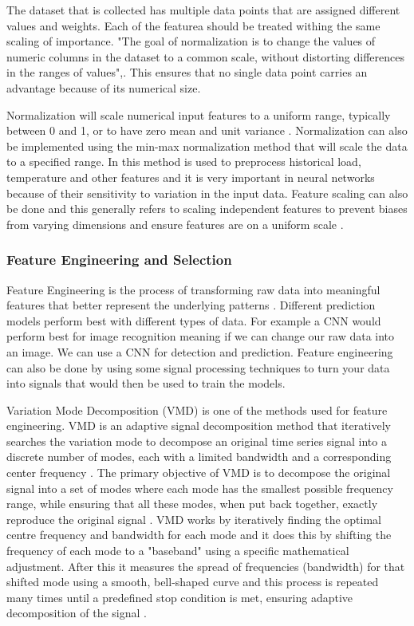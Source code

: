 The dataset that is collected has multiple data points that are assigned different values and weights. Each of the featurea should be treated withing the same scaling of importance. "The goal of normalization is to change the values of numeric columns in the dataset to a common scale, without distorting differences in the ranges of values",\cite{kappal2019data}. This ensures that no single data point carries an advantage because of its numerical size.

Normalization will scale numerical input features to a uniform range, typically between 0 and 1, or to have zero mean and unit variance \cite{dong2021short}. Normalization can also be implemented using the min-max normalization method that will scale the data to a specified range. In \cite{dong2021short} this method is used to preprocess historical load, temperature and other features and it is very important in neural networks because of their sensitivity to variation in the input data. Feature scaling can also be done and this generally refers to scaling independent features to prevent biases from varying dimensions and ensure features are on a uniform scale \cite{zhu2025novel}.
 
\subsubsection{Feature Engineering and Selection}

Feature Engineering is the process of transforming raw data into meaningful features that better represent the underlying patterns \cite{boopathy2024deep}. Different prediction models perform best with different types of data. For example a CNN would perform best for image recognition meaning if we can change our raw data into an image. We can use a CNN for detection and prediction. Feature engineering can also be done by using some signal processing techniques to turn your data into signals that would then be used to train the models.


Variation Mode Decomposition (VMD) is one of the methods used for feature engineering. VMD is an adaptive signal decomposition method that iteratively searches the variation mode to decompose an original time series signal into a discrete number of modes, each with a limited bandwidth and a corresponding center frequency \cite{huang2023two}. The primary objective of VMD is to decompose the original signal into a set of modes where each mode has the smallest possible frequency range, while ensuring that all these modes, when put back together, exactly reproduce the original signal \cite{wang2023short}. VMD works by iteratively finding the optimal centre frequency and bandwidth for each mode and it does this by shifting the frequency of each mode to a "baseband" using a specific mathematical adjustment. After this it measures the spread of frequencies (bandwidth) for that shifted mode using a smooth, bell-shaped curve and this process is repeated many times \cite{wang2023short} until a predefined stop condition is met, ensuring adaptive decomposition of the signal \cite{wang2023short}.

